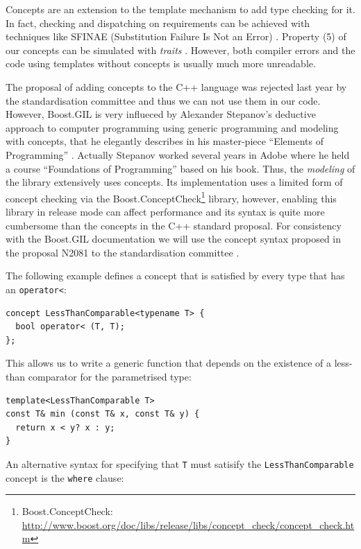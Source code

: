 Concepts are an extension to the template mechanism to add type
checking for it. In fact, checking and dispatching on requirements can
be achieved with techniques like SFINAE (Substitution Failure Is Not
an Error) \cite{vandervoorde08templates}. Property (5) of our concepts
can be simulated with \emph{traits} \cite{c++traits}. However, both
compiler errors and the code using templates without concepts is
usually much more unreadable.

The proposal of adding concepts to the C++ language was rejected last
year by the standardisation committee and thus we can not use them in
our code. However, Boost.GIL is very influeced by Alexander Stepanov's
deductive approach to computer programming using generic programming
and modeling with concepts, that he elegantly describes in his
master-piece ``Elements of Programming''
\cite{stepanov09elements}. Actually Stepanov worked several years in
Adobe where he held a course ``Foundations of Programming'' based on
his book. Thus, the \emph{modeling} of the library extensively uses
concepts. Its implementation uses a limited form of concept checking
via the Boost.ConceptCheck\footnote{
  Boost.ConceptCheck: \url{http://www.boost.org/doc/libs/release/libs/concept_check/concept_check.htm}}
\cite{siek00concept} library, however, enabling this library in
release mode can affect performance and its syntax is quite more
cumbersome than the concepts in the C++ standard proposal. For
consistency with the Boost.GIL documentation we will use the concept
syntax proposed in the proposal N2081 to the standardisation committee
\cite{gregor06concept}.

The following example defines a concept that is satisfied by every
type that has an \texttt{operator<}:

\begin{lstlisting}
concept LessThanComparable<typename T> {
  bool operator< (T, T);
};
\end{lstlisting}

This allows us to write a generic function that depends on the
existence of a less-than comparator for the parametrised type:

\begin{lstlisting}
template<LessThanComparable T>
const T& min (const T& x, const T& y) {
  return x < y? x : y;
}
\end{lstlisting}

An alternative syntax for specifying that \texttt{T} must satisify the
\texttt{LessThanComparable} concept is the \texttt{where} clause:

